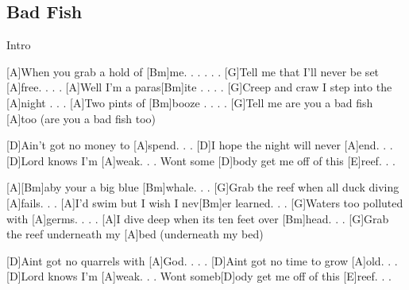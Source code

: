 \subsection*{Bad Fish   }
\begin{guitar}
Intro\qquad{}  

[A]When you grab a hold of [Bm]me. . . . . .
[G]Tell me that I'll never be set [A]free. . . .
[A]Well I'm a paras[Bm]ite . . . .
[G]Creep and craw I step into the [A]night . . . 
[A]Two pints of [Bm]booze . . . .
[G]Tell me are you a bad fish [A]too  (are you a bad fish too)


[D]Ain't got no money to [A]spend. . .
[D]I hope the night will never [A]end. . .
[D]Lord knows I'm [A]weak. . . 
Wont some [D]body get me off of this [E]reef. . .


      
[A][Bm]aby your a big blue [Bm]whale. . .
[G]Grab the reef when all duck diving [A]fails. . . 
[A]I'd swim but I wish I nev[Bm]er learned. . . 
[G]Waters too polluted with [A]germs. . . . 
[A]I dive deep when its ten feet over [Bm]head. . .
[G]Grab the reef underneath my [A]bed  (underneath my bed)



[D]Aint got no quarrels with [A]God. . . .
[D]Aint got no time to grow [A]old. . . 
[D]Lord knows I'm [A]weak. . .
Wont someb[D]ody get me off of this [E]reef. . .
\end{guitar}
